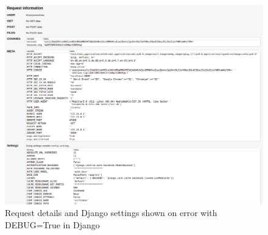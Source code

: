 \begin{figure}[H]
    \includegraphics[width=\columnwidth]{figures/pictures/djangoRequestDetails.jpg}
    \caption{Request details and Django settings shown on error with DEBUG=True in Django}
    \label{fig:djangoRequestDetails}
\end{figure}
